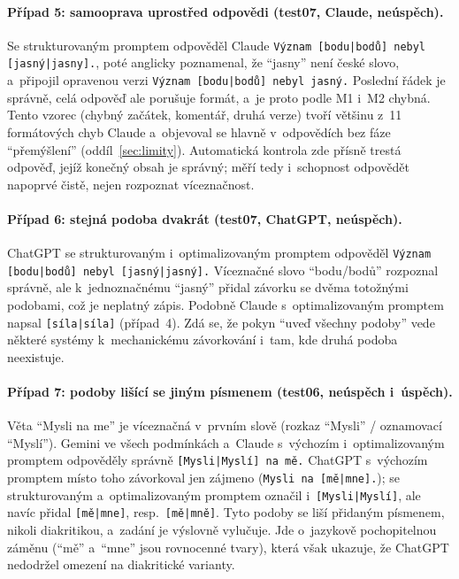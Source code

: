 \documentclass[11pt,a4paper]{article}
\begin{document}
\paragraph{Případ 5: samooprava uprostřed odpovědi (test07, Claude, neúspěch).}
Se strukturovaným promptem odpověděl Claude
\texttt{Význam [bodu|bodů] nebyl [jasný|jasny].}, poté anglicky
poznamenal, že \enquote{jasny} není české slovo, a~připojil opravenou
verzi \texttt{Význam [bodu|bodů] nebyl jasný.} Poslední řádek je
správně, celá odpověď ale porušuje formát, a~je proto podle M1 i~M2
chybná. Tento vzorec (chybný začátek, komentář, druhá verze) tvoří
většinu z~11 formátových chyb Claude a~objevoval se hlavně
v~odpovědích bez fáze \enquote{přemýšlení}
(oddíl~\ref{sec:limity}). Automatická kontrola zde přísně trestá
odpověď, jejíž konečný obsah je správný; měří tedy i~schopnost
odpovědět napoprvé čistě, nejen rozpoznat víceznačnost.

\paragraph{Případ 6: stejná podoba dvakrát (test07, ChatGPT, neúspěch).}
ChatGPT se strukturovaným i~optimalizovaným promptem odpověděl
\texttt{Význam [bodu|bodů] nebyl [jasný|jasný].} Víceznačné slovo
\enquote{bodu/bodů} rozpoznal správně, ale k~jednoznačnému
\enquote{jasný} přidal závorku se dvěma totožnými podobami, což je
neplatný zápis. Podobně Claude s~optimalizovaným promptem napsal
\texttt{[síla|síla]} (případ~4). Zdá se, že pokyn \enquote{uveď všechny
podoby} vede některé systémy k~mechanickému závorkování i~tam, kde
druhá podoba neexistuje.

\paragraph{Případ 7: podoby lišící se jiným písmenem (test06, neúspěch i~úspěch).}
Věta \enquote{Mysli na me} je víceznačná v~prvním slově
(rozkaz \enquote{Mysli} / oznamovací \enquote{Myslí}). Gemini ve všech
podmínkách a~Claude s~výchozím i~optimalizovaným promptem odpověděly
správně \texttt{[Mysli|Myslí] na mě.} ChatGPT s~výchozím promptem
místo toho závorkoval jen zájmeno (\texttt{Mysli na [mě|mne].}); se
strukturovaným a~optimalizovaným promptem označil i~\texttt{[Mysli|Myslí]},
ale navíc přidal \texttt{[mě|mne]}, resp.\ \texttt{[mě|mně]}. Tyto podoby se
liší přidaným písmenem, nikoli diakritikou, a~zadání je výslovně
vylučuje. Jde o~jazykově pochopitelnou záměnu (\enquote{mě} a~\enquote{mne}
jsou rovnocenné tvary), která však ukazuje, že ChatGPT nedodržel
omezení na diakritické varianty.
\end{document}
